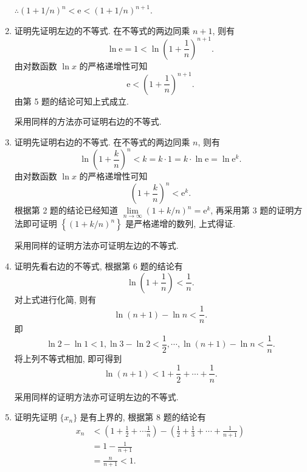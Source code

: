 \documentclass[12pt, a4paper]{article}
\begin{document}
\begin{enumerate}
        $\therefore \left(1 + 1/n\right)^n < \mathrm{e} < \left(1 + 1/n\right)^{n+1}$.
    \item {\heiti 证明}\quad 先证明左边的不等式. 在不等式的两边同乘 $n + 1$, 则有
        \begin{equation*}
            \ln\mathrm{e} = 1 < \ln\left(1 + \frac 1n\right)^{n+1}.    
        \end{equation*}
        由对数函数 $\ln x$ 的严格递增性可知
        \begin{equation*}
            \mathrm{e} < \left(1 + \frac 1n\right)^{n+1}.
        \end{equation*}
        由第 5 题的结论可知上式成立.
        
        采用同样的方法亦可证明右边的不等式.
    \item {\heiti 证明}\quad 先证明右边的不等式. 在不等式的两边同乘 $n$, 则有
        \begin{equation*}
            \ln\left(1 + \frac kn\right)^n < k = k \cdot 1 = k \cdot \ln\mathrm{e} = \ln\mathrm{e}^k.
        \end{equation*}
        由对数函数 $\ln x$ 的严格递增性可知
        \begin{equation*}
            \left(1 + \frac kn\right)^n < \mathrm{e}^k.
        \end{equation*}
        根据第 2 题的结论已经知道 $\lim\limits_{n\to\infty}\left(1 + k/n\right)^n = \mathrm{e}^k$, 再采用第 3 题的证明方法即可证明 $\left\{\left(1 + k/n\right)^n\right\}$ 是严格递增的数列,
        上式得证.
        
        采用同样的证明方法亦可证明左边的不等式.
    \item {\heiti 证明}\quad 先看右边的不等式, 根据第 6 题的结论有
        \[
            \ln\left(1 + \frac 1n\right) < \frac 1n.
        \]
        对上式进行化简, 则有
        \[
            \ln(n+1)-\ln n < \frac 1n.    
        \]
        即
        \begin{equation*}
            \ln2 - \ln1 < 1,
            \ln3 - \ln2 < \frac 12,
            \cdots,
            \ln(n+1) - \ln n < \frac 1n.
        \end{equation*}
        将上列不等式相加, 即可得到
        \[
            \ln(n + 1) < 1 + \frac 12 + \cdots + \frac 1n.    
        \]

        采用同样的证明方法亦可证明左边的不等式.
    \item {\heiti 证明}\quad 先证明 $\{x_n\}$ 是有上界的, 根据第 8 题的结论有
        \begin{align*}
            x_n &< \left(1 + \frac 12 + \cdots \frac 1n\right) - \left(\frac 12 + \frac13 + \cdots + \frac{1}{n+1}\right) \\
            &= 1 - \frac{1}{n+1} \\
            &= \frac{n}{n+1} < 1.
        \end{align*}
        

\end{enumerate}
\end{document}
